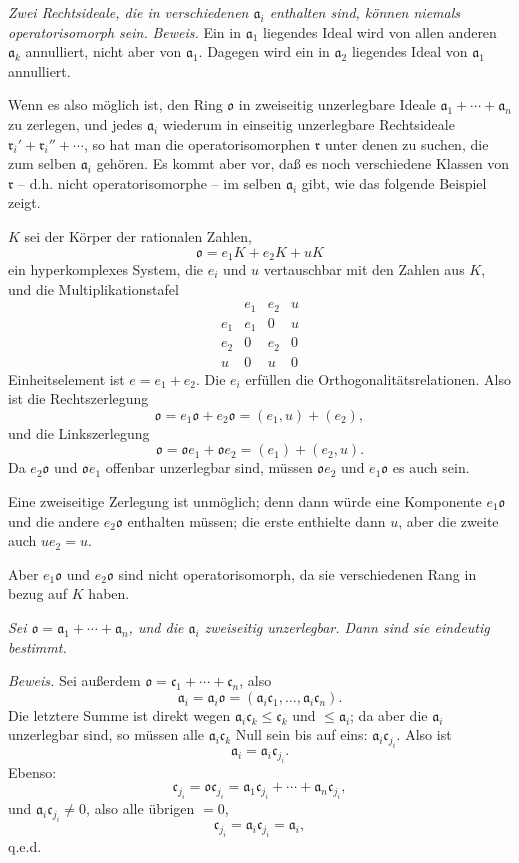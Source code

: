 \documentclass[11pt]{article}
\providecommand{\mo}{\mathfrak{o}}
\providecommand{\ma}{\mathfrak{a}}
\providecommand{\mc}{\mathfrak{c}}
\providecommand{\mr}{\mathfrak{r}}
\begin{document}
\emph{Zwei Rechtsideale, die in verschiedenen $\ma_i$ enthalten sind, können niemals operatorisomorph sein.}
\emph{Beweis.} Ein in $\ma_1$ liegendes Ideal wird von allen anderen $\ma_k$ annulliert, nicht aber von $\ma_1$. Dagegen wird ein in $\ma_2$ liegendes Ideal von $\ma_1$ annulliert.

Wenn es also möglich ist, den Ring $\mo$ in zweiseitig unzerlegbare Ideale $\ma_1+\cdots+\ma_n$ zu zerlegen, und jedes $\ma_i$ wiederum in einseitig unzerlegbare Rechtsideale $\mr_i'+\mr_i''+\cdots$, so hat man die operatorisomorphen $\mr$ unter denen zu suchen, die zum selben $\ma_i$ gehören. Es kommt aber vor, daß es noch verschiedene Klassen von $\mr$ -- d.h. nicht operatorisomorphe -- im selben $\ma_i$ gibt, wie das folgende Beispiel zeigt.

$K$ sei der Körper der rationalen Zahlen,
\[
        \mo=e_1K+e_2K+uK
\]
ein hyperkomplexes System, die $e_i$ und $u$ vertauschbar mit den Zahlen aus $K$, und die Multiplikationstafel
\[
\begin{array}{c|ccc}
     & e_1&e_2&u\\ \hline
 e_1 & e_1&0&u\\
 e_2 & 0&e_2&0\\
 u   & 0&u&0
\end{array}
\]
Einheitselement ist $e=e_1+e_2$. Die $e_i$ erfüllen die Orthogonalitätsrelationen. Also ist die Rechtszerlegung
\[
        \mo=e_1\mo+e_2\mo=(e_1,u)+(e_2),
\]
und die Linkszerlegung
\[
        \mo=\mo e_1+\mo e_2=(e_1)+(e_2,u).
\]
Da $e_2\mo$ und $\mo e_1$ offenbar unzerlegbar sind, müssen $\mo e_2$ und $e_1\mo$ es auch sein.

Eine zweiseitige Zerlegung ist unmöglich; denn dann würde eine Komponente $e_1\mo$ und die andere $e_2\mo$ enthalten müssen; die erste enthielte dann $u$, aber die zweite auch $ue_2=u$.

Aber $e_1\mo$ und $e_2\mo$ sind nicht operatorisomorph, da sie verschiedenen Rang in bezug auf $K$ haben.

\emph{Sei $\mo=\ma_1+\cdots+\ma_n$, und die $\ma_i$ zweiseitig unzerlegbar. Dann sind sie eindeutig bestimmt.}

\emph{Beweis.} Sei außerdem $\mo=\mc_1+\cdots+\mc_n$, also
\[
        \ma_i=\ma_i\mo=(\ma_i\mc_1,\ldots,\ma_i\mc_n).
\]
Die letztere Summe ist direkt wegen $\ma_i\mc_k\leq\mc_k$ und $\leq\ma_i$; da aber die $\ma_i$ unzerlegbar sind, so müssen alle $\ma_i\mc_k$ Null sein bis auf eins: $\ma_i\mc_{j_i}$. Also ist
\[
        \ma_i=\ma_i\mc_{j_i}.
\]
Ebenso:
\[
        \mc_{j_i}=\mo\mc_{j_i}=\ma_1\mc_{j_i}+\cdots+\ma_n\mc_{j_i},
\]
und $\ma_i\mc_{j_i}\ne0$, also alle übrigen $=0$,
\[
        \mc_{j_i}=\ma_i\mc_{j_i}=\ma_i,
\]
q.e.d.
\end{document}

